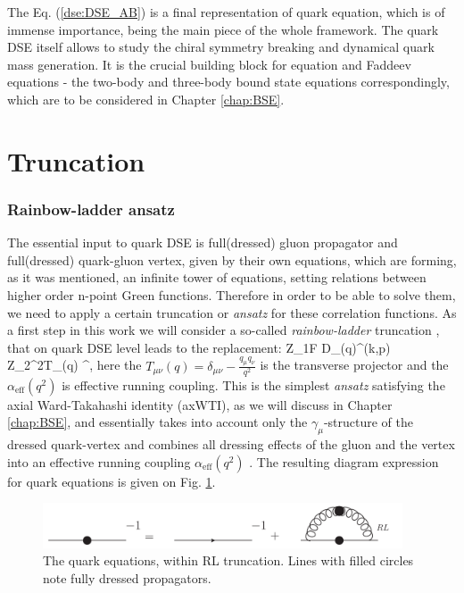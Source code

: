 The Eq. (\ref{dse:DSE_AB}) is a final representation of quark \DS equation, which is of immense importance, being the main piece of the whole framework. The quark DSE itself allows to study the chiral symmetry breaking and dynamical quark mass generation. It is the crucial building block for \BS equation and Faddeev equations - the two-body and three-body bound state equations correspondingly, which are to be considered in Chapter \ref{chap:BSE}. 


\section{Truncation}
\subsubsection*{Rainbow-ladder ansatz}
\label{sec:RL}
The essential input to quark DSE is full(dressed) gluon propagator and full(dressed) quark-gluon vertex, given by their own \DS equations, which are forming, as it was mentioned, an infinite tower of equations, setting relations between higher order n-point Green functions. Therefore in order to be able to solve them, we need to apply a certain truncation or \textit{ansatz} for these correlation functions. As a first step in this work we will consider a so-called \textit{rainbow-ladder} truncation \cite{Maris:1997hd}, that on quark DSE level leads to the replacement:
\beqa
	\label{dse:RL_trunc}
Z_{1F}  D_{\mu\nu}(q)\Gamma^\nu(k,p) \rightarrow Z_2^2T_{\mu\nu}(q) 
\gamma^\nu\;,
\eeqa
here the $T_{\mu\nu}(q)=\delta_{\mu \nu}-\frac{q_\mu q_\nu}{q^2}$ is the transverse projector and the $\alpha_{\mathrm{eff}}(q^2)$ is effective running coupling. This is the simplest \textit{ansatz} satisfying the axial Ward-Takahashi identity (axWTI), as we will discuss in Chapter \ref{chap:BSE}, and essentially takes into account only the $\gamma_\mu$-structure of the dressed quark-vertex and combines all dressing effects of the gluon and the vertex into an effective running coupling $\alpha_{\mathrm{eff}}(q^2)$ . The resulting diagram expression for quark \DS equations is given on Fig. \ref{fig:DSE_RL}.
\begin{figure}[H]
\tiny
 \begin{center}
  \includegraphics[width=0.95\textwidth]{figures/DSE_RL}
 \end{center}
 \caption{\footnotesize The quark \DS equations, within RL truncation. Lines with filled circles note fully dressed propagators.  }\label{fig:DSE_RL} 
\end{figure}
